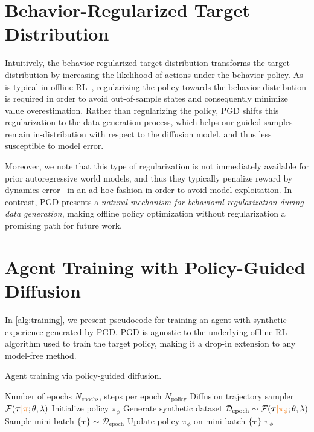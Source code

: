\documentclass[10pt]{article} %
\theoremstyle{plain}
\theoremstyle{definition}
\theoremstyle{remark}
\begin{document}
\section{Behavior-Regularized Target Distribution\label{sec:dist-motiv}}
Intuitively, the behavior-regularized target distribution transforms the target distribution by increasing the likelihood of actions under the behavior policy.
As is typical in offline RL~\citep{kumar2020conservative, fujimoto2021minimalist, bcq}, regularizing the policy towards the behavior distribution is required in order to avoid out-of-sample states and consequently minimize value overestimation.
Rather than regularizing the policy, PGD shifts this regularization to the data generation process, which helps our guided samples remain in-distribution with respect to the diffusion model, and thus less susceptible to model error.

Moreover, we note that this type of regularization is not immediately available for prior autoregressive world models, and thus they typically penalize reward by dynamics error~\citep{mopo, kidambi2020morel, lu2022revisiting} in an ad-hoc fashion in order to avoid model exploitation.
In contrast, PGD presents a \emph{natural mechanism for behavioral regularization during data generation}, making offline policy optimization without regularization a promising path for future work.

\section{Agent Training with Policy-Guided Diffusion}
In \autoref{alg:training}, we present pseudocode for training an agent with synthetic experience generated by PGD. PGD is agnostic to the underlying offline RL algorithm used to train the target policy, making it a drop-in extension to any model-free method.

\begin{algorithm}[htb]
    \flushleft
    \caption{Agent training via {\color{pgd}policy-guided} diffusion.}
    \label{alg:training}
    \begin{algorithmic}[1]
         Number of epochs $N_{\text{epochs}}$, steps per epoch $N_{\text{policy}}$
         Diffusion trajectory sampler $\mathcal{F}(\bm{\tau} {\color{pgd}| \pi};\theta, \lambda)$
        \State Initialize policy $\pi_{\phi}$
            \State Generate synthetic dataset $\mathcal{D}_{\text{epoch}} \sim \mathcal{F}(\bm{\tau} {\color{pgd}| \pi_{\phi}};\theta, \lambda)$
                \State Sample mini-batch $\{\bm{\tau}\} \sim \mathcal{D}_{\text{epoch}}$
                \State Update policy $\pi_{\phi}$ on mini-batch $\{\bm{\tau}\}$
            \EndFor
        \EndFor
         $\pi_{\phi}$
    \end{algorithmic}
\end{algorithm}
\end{document}
